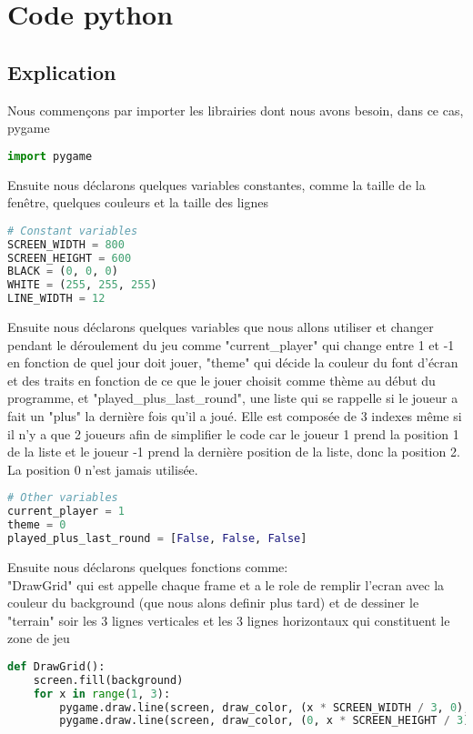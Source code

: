 \documentclass[12pt]{article}
\begin{document}
\lstset{style=mystyle}

\newpage
\section{Code python}
   \subsection{Explication}
    Nous commençons par importer les librairies dont nous avons besoin, dans ce cas, pygame
   \begin{lstlisting}[language=Python]
import pygame \end{lstlisting}
    Ensuite nous déclarons quelques variables constantes, comme la taille de la fenêtre, quelques couleurs et la taille des lignes
   \begin{lstlisting}[language=Python]
# Constant variables
SCREEN_WIDTH = 800
SCREEN_HEIGHT = 600
BLACK = (0, 0, 0)
WHITE = (255, 255, 255)
LINE_WIDTH = 12 \end{lstlisting}
    Ensuite nous déclarons quelques variables que nous allons utiliser et changer pendant le déroulement du jeu comme "current\_player" qui change entre 1 et -1 en fonction de quel jour doit jouer, "theme" qui décide la couleur du font d'écran et des traits en fonction de ce que le jouer choisit comme thème au début du programme, et "played\_plus\_last\_round", une liste qui se rappelle si le joueur a fait un "plus" la dernière fois qu'il a joué. Elle est composée de 3 indexes même si il n'y a que 2 joueurs afin de simplifier le code car le joueur 1 prend la position 1 de la liste et le joueur -1 prend la dernière position de la liste, donc la position 2. La position 0 n'est jamais utilisée.
   \begin{lstlisting}[language=Python]
# Other variables
current_player = 1
theme = 0
played_plus_last_round = [False, False, False] \end{lstlisting}

\newpage
Ensuite nous déclarons quelques fonctions comme: \\
"DrawGrid" qui est appelle chaque frame et a le role de remplir l'ecran avec la couleur du background (que nous alons definir plus tard) et de dessiner le "terrain" soir les 3 lignes verticales et les 3 lignes horizontaux qui constituent le zone de jeu
   \begin{lstlisting}[language=Python]
def DrawGrid():
    screen.fill(background)
    for x in range(1, 3):
        pygame.draw.line(screen, draw_color, (x * SCREEN_WIDTH / 3, 0), (x * SCREEN_WIDTH / 3, SCREEN_HEIGHT), LINE_WIDTH)
        pygame.draw.line(screen, draw_color, (0, x * SCREEN_HEIGHT / 3), (SCREEN_WIDTH, x * SCREEN_HEIGHT / 3), LINE_WIDTH) \end{lstlisting}
\end{document}
